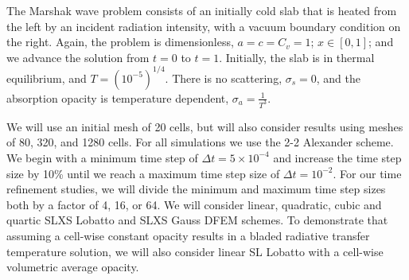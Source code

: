 The Marshak wave problem consists of an initially cold slab that is heated from the left by an incident radiation intensity, with a vacuum boundary condition on the right.
Again, the problem is dimensionless, $a=c=C_v=1$; $x\in[0,1]$; and we advance the solution from $t=0$ to $t=1$.
Initially, the slab is in thermal equilibrium, and $T=\left( 10^{-5} \right)^{1/4}$.
There is no scattering, $\sigma_s = 0$, and the absorption opacity is temperature dependent, $\sigma_a = \frac{1}{T^3}$.

We will use an initial mesh of 20 cells, but will also consider results using meshes of 80, 320, and 1280 cells.
For all simulations we use the 2-2 Alexander scheme.
We begin with a minimum time step of $\Delta t = 5\times 10^{-4}$ and increase the time step size by 10\% until we reach a maximum time step size of $\Delta t = 10^{-2}$.
For our time refinement studies, we will divide the minimum and maximum time step sizes both by a factor of 4, 16, or 64.
We will consider linear, quadratic, cubic and quartic SLXS Lobatto and SLXS Gauss DFEM schemes.
To demonstrate that assuming a cell-wise constant opacity results in a bladed radiative transfer temperature solution, we will also consider linear SL Lobatto with a cell-wise volumetric average opacity.


